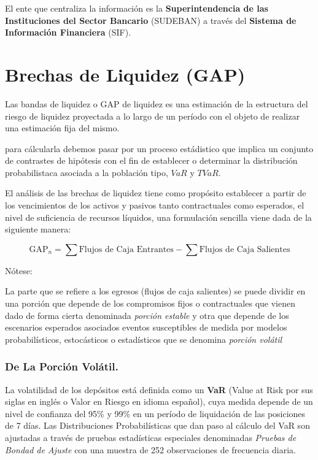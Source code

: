 \documentclass[]{article}
\begin{document}
El ente que centraliza la información es la \textbf{Superintendencia de
las Instituciones del Sector Bancario} (SUDEBAN) a través del
\textbf{Sistema de Información Financiera} (SIF).

\hypertarget{brechas-de-liquidez-gap}{%
\section{Brechas de Liquidez (GAP)}\label{brechas-de-liquidez-gap}}

Las bandas de liquidez o GAP de liquidez es una estimación de la
estructura del riesgo de liquidez proyectada a lo largo de un período
con el objeto de realizar una estimación fija del mismo.

para cálcularla debemos pasar por un proceso estádistico que implica un
conjunto de contrastes de hipótesis con el fin de establecer o
determinar la distribución probabilistaca asociada a la población tipo,
\(VaR\) y \(TVaR\).

El análisis de las brechas de liquidez tiene como propósito establecer a
partir de los vencimientos de los activos y pasivos tanto contractuales
como esperados, el nivel de suficiencia de recursos líquidos, una
formulación sencilla viene dada de la siguiente manera:

\[\text{GAP}_n = \sum \text{Flujos de Caja Entrantes} - \sum \text{Flujos de Caja Salientes}\]

Nótese:

La parte que se refiere a los egresos (flujos de caja salientes) se
puede dividir en una porción que depende de los compromisos fijos o
contractuales que vienen dado de forma cierta denominada \emph{porción
estable} y otra que depende de los escenarios esperados asociados
eventos susceptibles de medida por modelos probabilísticos, estocásticos
o estadísticos que se denomina \emph{porción volátil}

\hypertarget{de-la-porcion-volatil.}{%
\subsubsection{De La Porción Volátil.}\label{de-la-porcion-volatil.}}

La volatilidad de los depósitos está definida como un \textbf{VaR}
(Value at Risk por sus siglas en inglés o Valor en Riesgo en idioma
español), cuya medida depende de un nivel de confianza del 95\% y 99\%
en un período de liquidación de las posiciones de 7 días. Las
Distribuciones Probabilísticas que dan paso al cálculo del VaR son
ajustadas a través de pruebas estadísticas especiales denominadas
\emph{Pruebas de Bondad de Ajuste} con una muestra de 252 observaciones
de frecuencia diaria.
\end{document}
